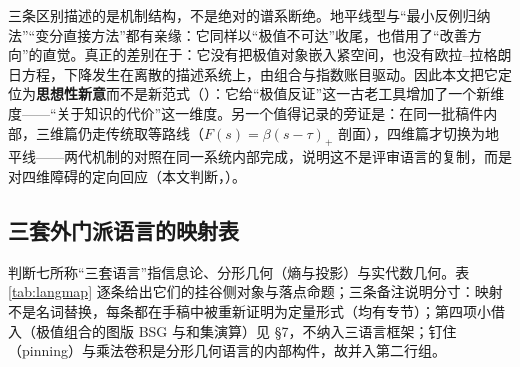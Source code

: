 \begin{cautbox}[诚实的边界]
三条区别描述的是机制结构，不是绝对的谱系断绝。地平线型与“最小反例归纳法”“变分直接方法”都有亲缘：它同样以“极值不可达”收尾，也借用了“改善方向”的直觉。真正的差别在于：它没有把极值对象嵌入紧空间，也没有欧拉--拉格朗日方程，下降发生在离散的描述系统上，由组合与指数账目驱动。因此本文把它定位为\textbf{思想性新意}而不是新范式（\cfM）：它给“极值反证”这一古老工具增加了一个新维度——“关于知识的代价”这一维度。另一个值得记录的旁证是：在同一批稿件内部，三维篇仍走传统取等路线（$F(s)=\beta(s-\tau)_{+}$ 剖面），四维篇才切换为地平线——两代机制的对照在同一系统内部完成，说明这不是评审语言的复制，而是对四维障碍的定向回应（本文判断，\cfM）。
\end{cautbox}

\subsection{三套外门派语言的映射表}

判断七所称“三套语言”指信息论、分形几何（熵与投影）与实代数几何。表 \ref{tab:langmap} 逐条给出它们的挂谷侧对象与落点命题；三条备注说明分寸：映射不是名词替换，每条都在手稿中被重新证明为定量形式（均有专节）；第四项小借入（极值组合的图版 BSG 与和集演算）见 §7，不纳入三语言框架；钉住（pinning）与乘法卷积是分形几何语言的内部构件，故并入第二行组。

